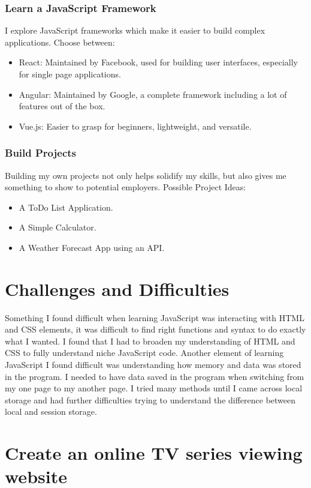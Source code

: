 \documentclass{article}
\begin{document}
\subsubsection{Learn a JavaScript Framework}

I explore JavaScript frameworks which make it easier to build complex applications.
Choose between:
\begin{itemize}
\item	React: Maintained by Facebook, used for building user interfaces, especially for single page applications.
\item	Angular: Maintained by Google, a complete framework including a lot of features out of the box.
\item	Vue.js: Easier to grasp for beginners, lightweight, and versatile.
\end{itemize}

\subsubsection{Build Projects}

Building my own projects not only helps solidify my skills, but also gives me something to show to potential employers.
Possible Project Ideas:
\begin{itemize}
\item	A ToDo List Application.
\item	A Simple Calculator.
\item	A Weather Forecast App using an API.
\end{itemize}


\section{Challenges and Difficulties}

Something I found difficult when learning JavaScript was interacting with HTML and CSS elements, it was difficult to find right functions and syntax to do exactly what I wanted. I found that I had to broaden my understanding of HTML and CSS to fully understand	niche	JavaScript	code. Another element of  learning  JavaScript  I  found  difficult  was understanding how memory and data was stored in the program. I needed to have data saved in the program when switching from my one page to my another page. I tried many methods until I came across local storage and had further difficulties trying to understand the difference between local and session storage.

\section{Create an online TV series viewing website}
\end{document}
